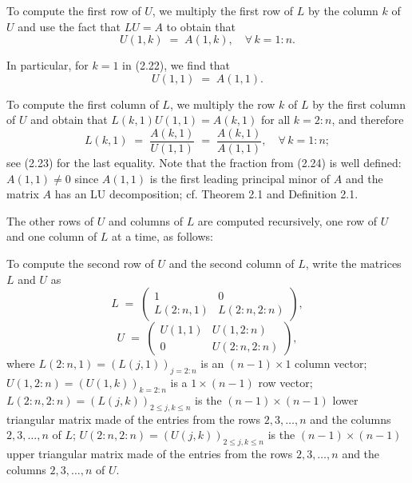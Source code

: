 
To compute the first row of $U$, we multiply the first row of $L$ by the
column $k$ of $U$ and use the fact that $LU=A$ to obtain that
\begin{equation}
U(1,k) \;=\; A(1,k), \quad \forall\, k=1:n.
\end{equation}

In particular, for $k=1$ in (2.22), we find that
\begin{equation}
U(1,1) \;=\; A(1,1).
\end{equation}

To compute the first column of $L$, we multiply the row $k$ of $L$ by
the first column of $U$ and obtain that $L(k,1)U(1,1) = A(k,1)$ for all
$k=2:n$, and therefore
\begin{equation}
L(k,1) \;=\; \frac{A(k,1)}{U(1,1)} \;=\; \frac{A(k,1)}{A(1,1)}, \quad \forall\, k=1:n;
\end{equation}
see (2.23) for the last equality. Note that the fraction from (2.24) is
well defined: $A(1,1)\neq 0$ since $A(1,1)$ is the first leading
principal minor of $A$ and the matrix $A$ has an LU decomposition; cf.
Theorem 2.1 and Definition 2.1.

The other rows of $U$ and columns of $L$ are computed recursively, one
row of $U$ and one column of $L$ at a time, as follows:

To compute the second row of $U$ and the second column of $L$, write the
matrices $L$ and $U$ as
\begin{equation}
L \;=\; \begin{pmatrix} 1 & 0 \\ L(2:n,1) & L(2:n,2:n)\end{pmatrix},
\end{equation}
\begin{equation}
U \;=\; \begin{pmatrix} U(1,1) & U(1,2:n) \\ 0 & U(2:n,2:n)\end{pmatrix},
\end{equation}
where $L(2:n,1) = (L(j,1))_{j=2:n}$ is an $(n-1)\times 1$ column vector;
$U(1,2:n) = (U(1,k))_{k=2:n}$ is a $1\times(n-1)$ row vector;
$L(2:n,2:n) = (L(j,k))_{2\le j,k\le n}$ is the $(n-1)\times(n-1)$ lower
triangular matrix made of the entries from the rows $2, 3, \ldots, n$
and the columns $2, 3, \ldots, n$ of $L$; $U(2:n,2:n) =
(U(j,k))_{2\le j,k\le n}$ is the $(n-1)\times(n-1)$ upper triangular
matrix made of the entries from the rows $2, 3, \ldots, n$ and the
columns $2, 3, \ldots, n$ of $U$.

